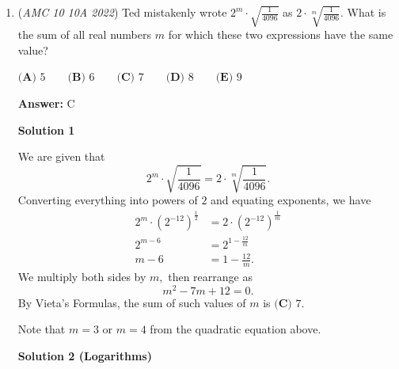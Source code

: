 \begin{enumerate}
 Note: I just changed it into Latex as it looked a little bit unclear.

 Note: This is incredibly similar to Solution 1. In fact, the only difference is the method of Algebra used to calculate the final answer, which in my opinion doesn’t really constitute a whole new solution.

 



\textbf{Solution 3 (manipulation)}

Let the variable names be as in Solution 1. We have $l^2+w^2=64$ (I) and $(l-2)^2+(w-2)^2=32\implies l^2+w^2-4l-4w+4+4=32$ (II). Substituting the LHS of (I) into (II) and simplifying, we get $64-4(l+w)=24\implies l+w=16-6=10$ (III). Let (IV) be (III)$^2-$(I). Then, (IV) is $2lw=36 \implies lw = 18$. Therefore, $\boxed{\textbf{(E) } 18}$ is our solution!

 


 


	\item (\textit{AMC 10 10A 2022}) Ted mistakenly wrote $2^m\cdot\sqrt{\frac{1}{4096}}$ as $2\cdot\sqrt[m]{\frac{1}{4096}}.$ What is the sum of all real numbers $m$ for which these two expressions have the same value?


 $\textbf{(A) } 5 \qquad \textbf{(B) } 6 \qquad \textbf{(C) } 7 \qquad \textbf{(D) } 8 \qquad \textbf{(E) } 9$

 \textbf{Answer: }C



\textbf{Solution 1}

We are given that 
 \[2^m\cdot\sqrt{\frac{1}{4096}} = 2\cdot\sqrt[m]{\frac{1}{4096}}.\]Converting everything into powers of $2$ and equating exponents, we have
 \begin{align*} 2^m\cdot(2^{-12})^{\frac12} &= 2\cdot (2^{-12})^{\frac1m} \\ 2^{m-6} &= 2^{1-\frac{12}{m}} \\ m-6 &= 1-\frac{12}{m}. \end{align*}
We multiply both sides by $m,$ then rearrange as 
 \[m^2-7m+12=0.\]By Vieta's Formulas, the sum of such values of $m$ is $\boxed{\textbf{(C) } 7}.$

 Note that $m=3$ or $m=4$ from the quadratic equation above.

 



\textbf{Solution 2 (Logarithms)}


\end{enumerate}
